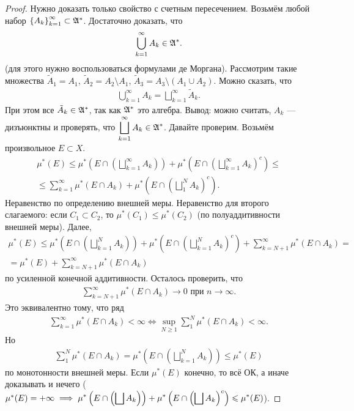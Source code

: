 \documentclass[a4paper,12pt]{article}
\theoremstyle{definition}
\theoremstyle{plain}
\theoremstyle{plain}
\theoremstyle{plain}
\theoremstyle{plain}
\theoremstyle{definition}
\theoremstyle{definition}
\theoremstyle{definition}
\theoremstyle{definition}
\theoremstyle{definition}
\theoremstyle{definition}
\theoremstyle{plain}
\theoremstyle{plain}
\theoremstyle{plain}
\theoremstyle{plain}
\theoremstyle{definition}
\theoremstyle{definition}
\theoremstyle{definition}
\theoremstyle{definition}
\theoremstyle{definition}
\newcommand{\then}{\ensuremath \implies}
\newcommand{\A}{\ensuremath \mathfrak{A}}
\begin{document}
\begin{proof}
 Нужно доказать только свойство с счетным пересечением. Возьмём любой набор $ \left\{ A_k \right\}_{k=1}^\infty \subset \A^\ast $. Достаточно доказать, что
 \begin{align*}
	 \bigcup_{k=1}^{\infty} A_k \in \A^\ast
 .\end{align*} (для этого нужно воспользоваться формулами де Моргана). Рассмотрим такие множества $ \tilde A_1 = A_1 $, $ \tilde A_2 = A_2 \setminus A_1 $, $ \tilde A_3 = A_3 \setminus (A_1 \cup A_2)$. Можно сказать, что
 \begin{align*}
  \bigcup_{k=1}^\infty A_k = \bigsqcup_{k=1}^\infty \tilde A_k
 .\end{align*} При этом все $ \tilde A_k \in \A^\ast $, так как $ \A^\ast $ это алгебра. Вывод: можно считать, $ A_k $ --- дизъюнктны и проверять, что $ \displaystyle \bigsqcup_{k=1}^\infty A_k \in \A^\ast $. Давайте проверим. Возьмём произвольное $ E \subset X $.
 \begin{align*}
  \mu^\ast(E) \leqslant \mu^\ast\left( E \cap \left( \bigsqcup_{k=1}^\infty A_k \right) \right) + \mu^\ast\left( E \cap \left( \bigsqcup_{k=1}^\infty A_k \right)^c \right) \leqslant \\
  \leqslant \sum_{k=1}^{\infty} \mu^\ast(E \cap A_k) + \mu^\ast\left( E \cap \left( \bigsqcup_1^N A_k \right)^c \right)
 .\end{align*} Неравенство по определению внешней меры. Неравенство для второго слагаемого: если $ C_1 \subset C_2 $, то $ \mu^\ast(C_1) \leqslant \mu^\ast(C_2) $ (по полуаддитивности внешней меры).
 Далее,
 \begin{align*}
	 \mu^\ast(E) \leqslant \mu^\ast\left( E \cap \left( \bigsqcup_{k=1}^N A_k \right) \right) + \mu^\ast\left( E \cap \left( \bigsqcup_{k=1}^N A_k \right)^c\right) + \sum_{k=N+1}^{\infty} \mu^\ast(E \cap A_k) = \\
  = \mu^\ast(E) + \sum_{k=N+1}^{\infty} \mu^\ast(E \cap A_k)
 \end{align*} по усиленной конечной аддитивности. Осталось проверить, что
 \begin{align*}
  \sum_{k=N+1}^{\infty} \mu^\ast(E \cap A_k) \to 0 \text{ при } n \to \infty
 .\end{align*} Это эквивалентно тому, что ряд
 \begin{align*}
  \sum_{k=1}^{\infty}  \mu^\ast (E \cap A_k) < \infty \iff \sup_{N \geqslant 1} \sum_1^N \mu^\ast(E \cap A_k) < \infty
 .\end{align*} Но
 \begin{align*}
  \sum_{1}^{N} \mu^\ast(E \cap A_k) = \mu^\ast\left(E \cap \left(\bigsqcup_{k=1}^N A_k\right)\right) \leqslant \mu^\ast(E)
 \end{align*} по монотонности внешней меры. Если $ \mu^\ast(E) $ конечно, то всё ОК, а иначе доказывать и нечего ($ \mu^\ast(E) = +\infty \then \displaystyle \mu^\ast\left(E \cap \left( \bigsqcup A_k \right)\right)  + \mu^\ast\left(E \cap \left( \bigsqcup A_k \right)^c\right) \leqslant \mu^\ast(E)$).
\end{proof}
\end{document}
